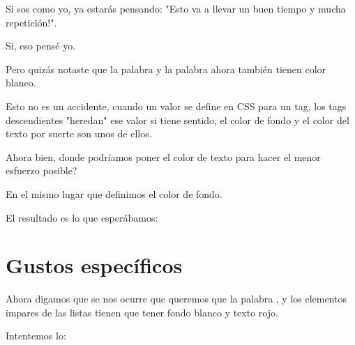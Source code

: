 \documentclass[letterpaper,10pt,spanish]{sphinxmanual}
\begin{document}
Si sos como yo, ya estarás pensando: "Esto va a llevar un buen tiempo y mucha repetición!".

Si, eso pensé yo.

Pero quizás notaste que la palabra  y la palabra  ahora
también tienen color blanco.

Esto no es un accidente, cuando un valor se define en CSS para un tag, los tags
descendientes "heredan" ese valor si tiene sentido, el color de fondo y el
color del texto por suerte son unos de ellos.

Ahora bien, donde podríamos poner el color de texto para hacer el menor esfuerzo posible?

En el mismo lugar que definimos el color de fondo.

%
\begin{sphinxVerbatim}[commandchars=\\\{\}]
 
\end{sphinxVerbatim}

El resultado es lo que esperábamos:

\begin{figure}[htbp]
\centering

\noindent{}
\end{figure}


\section{Gustos específicos}
\label{\detokenize{css-y-cosas-por-el-estilo:gustos-especificos}}
Ahora digamos que se nos ocurre que queremos que la palabra ,
 y los elementos impares de las listas tienen que tener fondo blanco y
texto rojo.

Intentemos lo:
\end{document}

